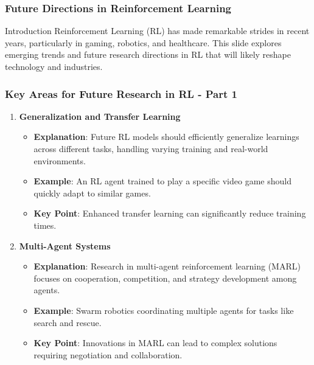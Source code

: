 \documentclass[aspectratio=169]{beamer}
\begin{document}
\begin{frame}[fragile]
    \frametitle{Future Directions in Reinforcement Learning}
    \begin{block}{Introduction}
        Reinforcement Learning (RL) has made remarkable strides in recent years, particularly in gaming, robotics, and healthcare. This slide explores emerging trends and future research directions in RL that will likely reshape technology and industries.
    \end{block}
\end{frame}

\begin{frame}[fragile]
    \frametitle{Key Areas for Future Research in RL - Part 1}
    \begin{enumerate}
        \item \textbf{Generalization and Transfer Learning}
        \begin{itemize}
            \item \textbf{Explanation}: Future RL models should efficiently generalize learnings across different tasks, handling varying training and real-world environments.
            \item \textbf{Example}: An RL agent trained to play a specific video game should quickly adapt to similar games.
            \item \textbf{Key Point}: Enhanced transfer learning can significantly reduce training times.
        \end{itemize}

        \item \textbf{Multi-Agent Systems}
        \begin{itemize}
            \item \textbf{Explanation}: Research in multi-agent reinforcement learning (MARL) focuses on cooperation, competition, and strategy development among agents.
            \item \textbf{Example}: Swarm robotics coordinating multiple agents for tasks like search and rescue.
            \item \textbf{Key Point}: Innovations in MARL can lead to complex solutions requiring negotiation and collaboration.
        \end{itemize}
    \end{enumerate}
\end{frame}
\end{document}
